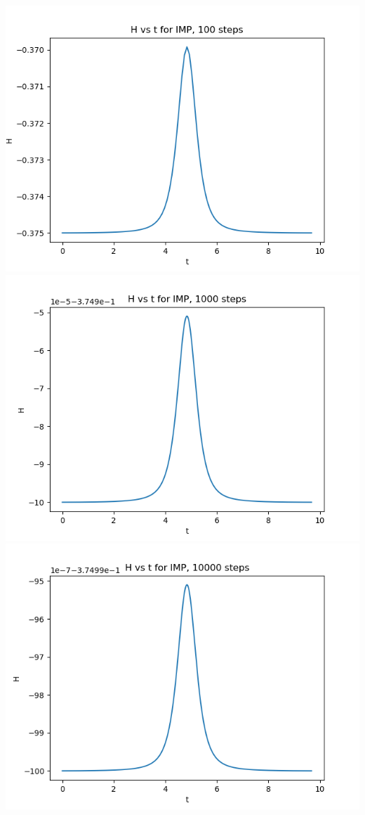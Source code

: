 \documentclass{article}
\begin{document}
\begin{enumerate}[label=(\alph*)]
\begin{center}
	\includegraphics[scale=.3]{hw5 IMP ham 100 steps}
	\includegraphics[scale=.3]{hw5 IMP ham 1000 steps}
	\includegraphics[scale=.3]{hw5 IMP ham 10000 steps}
\end{center}



\end{enumerate}
\end{document}
